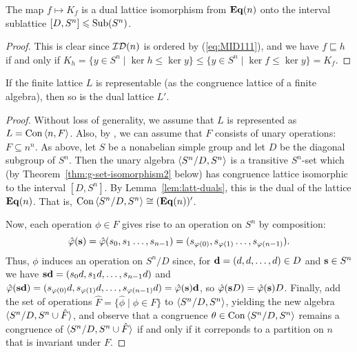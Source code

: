 \begin{lemma}
  \label{lem:latt-duals}
  The map $f \mapsto K_f$ is a dual lattice isomorphism from $\mathbf{Eq}(n)$ onto the
  interval sublattice $[D, S^n] \leqslant \operatorname{Sub}(S^n)$.
\end{lemma}
\begin{proof}
  This is clear since $\mathcal{ID}(n)$ is ordered by (\ref{eq:MID111}), and 
  we have 
  $f\sqsubseteq h$ if and only if
  $K_h = \{y \in S^n \mid \ker h \leq \ker y \}
  \leq \{y \in S^n \mid \ker f \leq \ker y \} =  K_f$.
\end{proof}

\begin{theorem}
  \label{thm:duals-interv-subl}
  If the finite lattice $L$ is representable (as the congruence lattice of a
  finite algebra), then so is the dual lattice $L'$.
\end{theorem}
\begin{proof}
  Without loss of generality, we assume that $L$ is represented
  as $L = \operatorname{Con\,} \langle n, F\rangle$.
  Also, by \cite[Theorem~4.18]{alvi:1987}, we can assume
  that $F$ consists of unary operations: $F \subseteq n^n$.  
  As above, let $S$ be a nonabelian simple group
  and let $D$ be the diagonal subgroup of $S^n$.
  Then the unary algebra $\langle S^n/D, S^n\rangle$  is a transitive $S^n$-set which (by
  Theorem~\ref{thm:g-set-isomorphism2} below) has congruence lattice isomorphic
  to the interval $[D, S^n]$.  By Lemma~\ref{lem:latt-duals}, this is the dual
  of the lattice $\mathbf{Eq}(n)$.  That is, 
  $\operatorname{Con\,} \langle S^n/D, S^n\rangle \cong (\mathbf{Eq}(n))'$.


  
  Now, each operation $\phi \in F$ gives rise to an operation on $S^n$
  by composition:
  \[
  \hat{\varphi}(\mathbf{s}) = \hat{\varphi}(s_{0}, s_1  \dots, s_{n-1}) = (s_{\varphi(0)},
  s_{\varphi(1)}\dots, s_{\varphi(n-1)}). 
  \]
  Thus, $\phi$ induces  an operation on $S^n/D$ since, for 
  $\mathbf{d} = (d, d, \dots, d) \in D$ and $\mathbf{s} \in S^n$ we have 
  $\mathbf{s} \mathbf{d} = (s_{0}d, s_{1}d, \dots , s_{n-1}d)$ and 
  $\hat{\varphi}(\mathbf{s} \mathbf{d}) = (s_{\varphi(0)}d, s_{\varphi(1)}d, \dots , s_{\varphi(n-1)}d) = \hat{\varphi}(\mathbf{s}) \mathbf{d}$,
  so $\hat{\varphi}(\mathbf{s} D)  = \hat{\varphi}(\mathbf{s}) D$.  Finally, add the set of operations 
  $\hat{F} = \{\hat{\phi} \mid \phi \in F\}$ to $\langle S^n/D, S^n\rangle$, yielding the
  new algebra  $\langle S^n/D, S^n \cup \hat{F}\rangle$, and observe
  that a congruence $\theta \in \operatorname{Con\,}\langle S^n/D, S^n\rangle$ remains a congruence of
  $\langle S^n/D, S^n \cup \hat{F}\rangle$ if and only if it correponds to a partition on
  $n$ that is invariant under $F$.
\end{proof}

